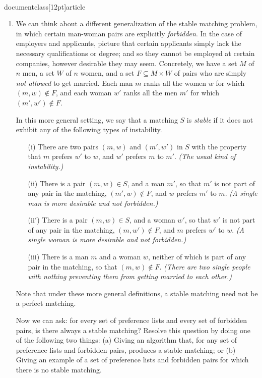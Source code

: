 \\documentclass[12pt]{article}
\begin{document}
\begin{enumerate}

\item 

We can think about a
different generalization of the stable matching problem, in
which certain man-woman pairs are explicitly {\em forbidden}.
In the case of employers and applicants, picture that certain
applicants simply lack the necessary qualifications or degree;
and so they cannot be employed at certain companies,
however desirable they may seem.
Concretely, we have a set $M$ of $n$ men, a set $W$
of $n$ women, and a set $F \subseteq M \times W$
of pairs who are simply {\em not allowed} to get married.
Each man $m$ ranks all the women $w$ for which $(m,w) \not\in F$,
and each woman $w'$ ranks all the men $m'$ for which $(m',w') \not\in F$.

In this more general setting, we say that a matching $S$ is {\em stable}
if it does not exhibit any of the following types of instability.
\begin{itemize}
\item[(i)] There are two pairs $(m,w)$ and $(m',w')$ in $S$
with the property that $m$ prefers $w'$ to $w$,
and $w'$ prefers $m$ to $m'$.
{\em (The usual kind of instability.)}
\item[(ii)] There is a pair $(m,w) \in S$, and a man $m'$,
so that $m'$ is not part of any pair in the matching,
$(m',w) \not\in F$, and $w$ prefers $m'$ to $m$.
{\em (A single man is more desirable and not forbidden.)}
\item[(ii$'$)] There is a pair $(m,w) \in S$, and a woman $w'$,
so that $w'$ is not part of any pair in the matching,
$(m,w') \not\in F$, and $m$ prefers $w'$ to $w$.
{\em (A single woman is more desirable and not forbidden.)}
\item[(iii)] There is a man $m$ and a woman $w$,
neither of which is part of any pair in the matching,
so that $(m,w) \not\in F$.
{\em (There are two single people with nothing preventing
them from getting married to each other.)}
\end{itemize}
Note that under these more general definitions, a stable matching
need not be a perfect matching.

Now we can ask:
for every set of preference lists and every set of forbidden pairs,
is there always a stable matching?
Resolve this question by doing one of the following two things:
(a) Giving an algorithm that, for any set of
preference lists and forbidden pairs,
produces a stable matching;
or (b) Giving an example of a set of preference lists and forbidden pairs
for which there is no stable matching.


\end{enumerate}
\end{document}
